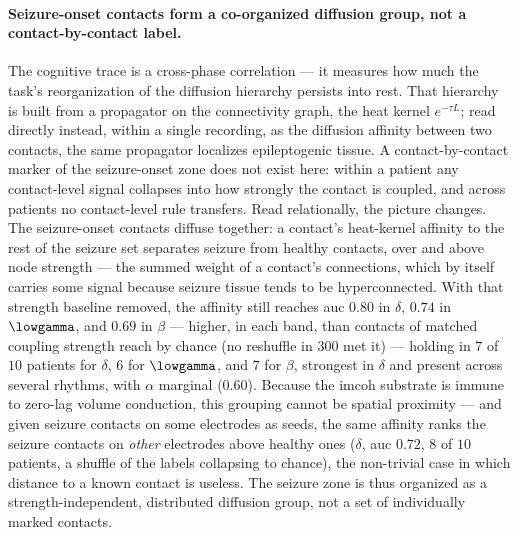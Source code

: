 \paragraph{Seizure-onset contacts form a co-organized diffusion group, not a contact-by-contact label.}
The cognitive trace is a cross-phase correlation --- it measures how much the task's reorganization of the diffusion hierarchy persists into rest. That hierarchy is built from a propagator on the connectivity graph, the heat kernel \(e^{-\tau L}\); read directly instead, within a single recording, as the diffusion affinity between two contacts, the same propagator localizes epileptogenic tissue. A contact-by-contact marker of the seizure-onset zone does not exist here: within a patient any contact-level signal collapses into how strongly the contact is coupled, and across patients no contact-level rule transfers. Read relationally, the picture changes. The seizure-onset contacts diffuse together: a contact's heat-kernel affinity to the rest of the seizure set separates seizure from healthy contacts, over and above node strength --- the summed weight of a contact's connections, which by itself carries some signal because seizure tissue tends to be hyperconnected. With that strength baseline removed, the affinity still reaches \gls{auc} \(0.80\) in \(\delta\), \(0.74\) in \(\lowgamma\), and \(0.69\) in \(\beta\) --- higher, in each band, than contacts of matched coupling strength reach by chance (no reshuffle in \(300\) met it) --- holding in \(7\) of \(10\) patients for \(\delta\), \(6\) for \(\lowgamma\), and \(7\) for \(\beta\), strongest in \(\delta\) and present across several rhythms, with \(\alpha\) marginal (\(0.60\)). Because the \gls{imcoh} substrate is immune to zero-lag volume conduction, this grouping cannot be spatial proximity --- and given seizure contacts on some electrodes as seeds, the same affinity ranks the seizure contacts on \emph{other} electrodes above healthy ones (\(\delta\), \gls{auc} \(0.72\), \(8\) of \(10\) patients, a shuffle of the labels collapsing to chance), the non-trivial case in which distance to a known contact is useless. The seizure zone is thus organized as a strength-independent, distributed diffusion group, not a set of individually marked contacts.
